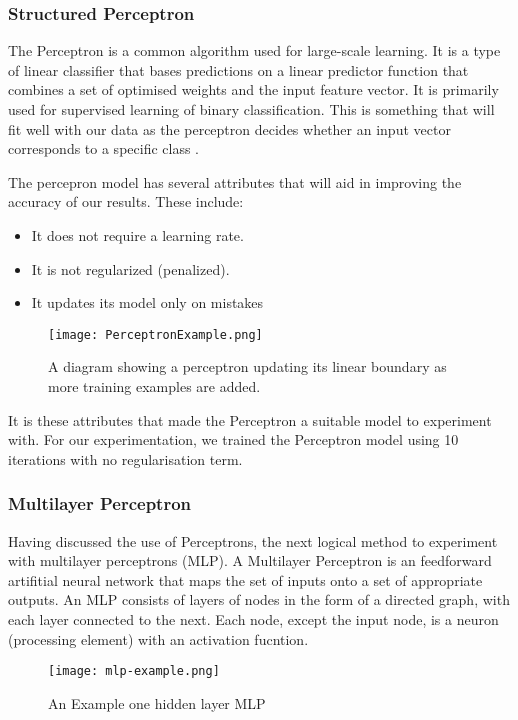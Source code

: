\documentclass[bsc,frontabs,twoside,singlespacing,parskip,deptreport]{infthesis}     %
\begin{document}
\subsubsection{Structured Perceptron}
The Perceptron is a common algorithm used for large-scale learning.
It is a type of linear classifier that bases predictions on a linear predictor function that combines a set of optimised weights
and the input feature vector.
It is primarily used for supervised learning of binary classification.
This is something that will fit well with our data as the perceptron decides whether an input vector
corresponds to a specific class \cite{freund1999large}.

The percepron model has several attributes that will aid in improving the accuracy of our results.
These include:
\begin{itemize}
\item It does not require a learning rate.
\item It is not regularized (penalized).
\item It updates its model only on mistakes
\end{itemize}

\begin{figure}[ht]
  \centering
  \texttt{[image: PerceptronExample.png]}
  \caption{A diagram showing a perceptron updating its linear boundary as more training examples are added. }
\end{figure}


It is these attributes that made the Perceptron a suitable model to experiment with.
For our experimentation, we trained the Perceptron model using  10 iterations with no regularisation term.
\subsubsection{Multilayer Perceptron}
Having discussed the use of Perceptrons, the next logical method to experiment with multilayer perceptrons (MLP).
A Multilayer Perceptron is an feedforward artifitial neural network that maps the set of inputs
onto a set of appropriate outputs.
An MLP consists of layers of  nodes in the form of a directed graph, with each layer connected to the next.
Each node, except the input node, is a neuron (processing element) with an activation fucntion.

\begin{figure}
  \centering
  \texttt{[image: mlp-example.png]}
  \caption{An Example one hidden layer MLP \cite{}}%
  \label{fig:mlp}
\end{figure}
\end{document}
